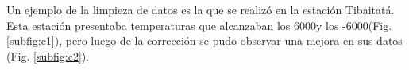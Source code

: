 \begin{comment}
\item 35025080 PNN Chingaza la Calera. Estación con un largo periodo de tiempo sin datos. Existen dos periodos de tiempo con datos, al inicio del segundo periodo de datos se registran altas temperaturas. Se deben eliminar los datos que sean superiores a 4 veces la desviación estándar más el promedio y los valores que sean 4 veces la desviación estándar menos el promedio.

\item 35025090 Bosque Intervenido. Estación con algunos lapsos de tiempo faltante, pero con una buena homogeneidad. Yo no haría cambio alguno.

\item 35025090 Calostros Bajos. Estación con algunos periodos de tiempo con datos faltantes, pero con una buena homogeneidad. No es necesario aplicar otro filtro.

\item 35035130 Calostro Bajo. Estación con algunos periodos de tiempo con datos faltantes.

\item 35075070 Chinavita Fusavita. Estación con un buen comportamiento, presenta algunos datos atípicos. Se deben eliminar los datos que sean superiores a 4 veces la desviación estándar más el promedio y los valores que sean 4 veces la desviación estándar menos el promedio.

\item 35075080 PMO  Rabanál Boyacá, Ventaquemada. Estación en la que existe un período sin datos.

\item 35085080 La capilla La Unión. Estación con buen comportamiento, un período de tiempo sin datos en el año 2012. Se deben eliminar los datos que sean superiores a 4 veces la desviación estándar más el promedio y los valores que sean 4 veces la desviación estándar menos el promedio.


En la Tabla \ref{tab:res_tab_autom} podemos observar que aún quedaron valores de temperatura del aire con problemas, pero muchos de los datos no validos fueron eliminados y se obtuvo una mejor serie de datos, la cuál se presta para hacer análisis. Además hay unas estaciones que luego de el control de calidad no presentan datos sospechosos. Es importante notar que sólo la estación UNIV NACIONAL presenta datos sospechosos en los últimos años (2017), esto implica que la calidad de los datos luego ha venido mejorando. Los datos atípicos pueden ser eliminados fácilmente, pero antes de eliminarlos se debe hacer un análisis estación por estación teniendo en cuenta la zona, temporadas del año y años ENSO, ya que los datos sospechosos pueden ser datos extremos y si se eliminan sería un error.
\end{enumerate}
\end{comment}
Un ejemplo de la limpieza de datos es la que se realizó en la estación Tibaitatá. Esta estación presentaba temperaturas que alcanzaban los 6000\celc y los -6000\celc (Fig. \ref{subfig:c1}), pero luego de la corrección se pudo observar una mejora en sus datos (Fig. \ref{subfig:c2}).

